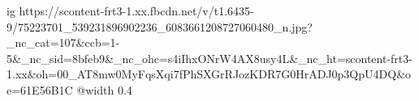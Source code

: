  
 
 
 
 

\ifcmt
  ig https://scontent-frt3-1.xx.fbcdn.net/v/t1.6435-9/75223701_539231896902236_6083661208727060480_n.jpg?_nc_cat=107&ccb=1-5&_nc_sid=8bfeb9&_nc_ohc=s4iIhxONrW4AX8usy4L&_nc_ht=scontent-frt3-1.xx&oh=00_AT8mw0MyFqsXqi7fPhSXGrRJozKDR7G0HrADJ0p3QpU4DQ&oe=61E56B1C
  @width 0.4
\fi
